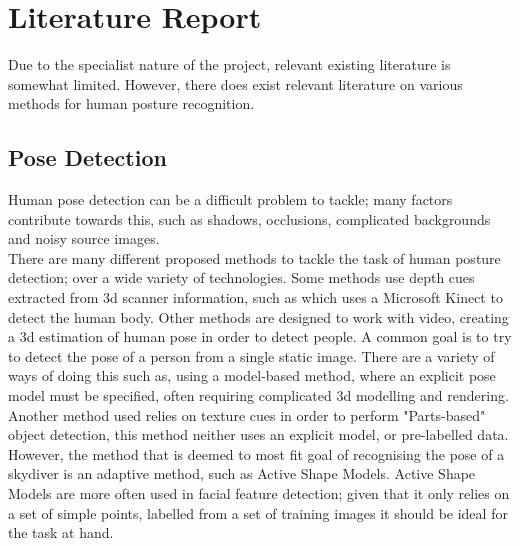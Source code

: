 \documentclass[a4paper, 12pt]{article}
\begin{document}
\section{Literature Report}
%
Due to the specialist nature of the project, relevant existing literature is somewhat limited.
However, there does exist relevant literature on various methods for human posture recognition.

\subsection{Pose Detection}
%
Human pose detection can be a difficult problem to tackle; many factors contribute towards this, such as shadows, occlusions, complicated backgrounds and noisy source images.\\
There are many different proposed methods to tackle the task of human posture detection; over a wide variety of technologies. Some methods use depth cues extracted from 3d scanner information, such as \cite{kinect_IR} which uses a Microsoft Kinect to detect the human body. Other methods are designed to work with video\cite{video}, creating a 3d estimation of human pose in order to detect people. A common goal is to try to detect the pose of a person from a single static image. There are a variety of ways of doing this such as, using a model-based method, where an explicit pose model must be specified, often requiring complicated 3d modelling and rendering\cite{model-based}. Another method used relies on texture cues in order to perform "Parts-based" object detection\cite{monocular_still_images}, this method neither uses an explicit model, or pre-labelled data.\\
However, the method that is deemed to most fit goal of recognising the pose of a skydiver is an adaptive method, such as Active Shape Models. Active Shape Models are more often used in facial feature detection\cite{cootes}\cite{face_recognition}; given that it only relies on a set of simple points, labelled from a set of training images it should be ideal for the task at hand.
%
\end{document}
